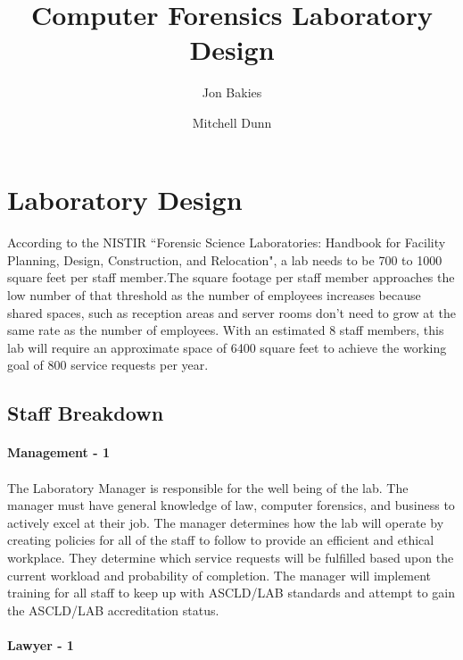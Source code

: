 \documentclass{article}
\begin{document}
\title{Computer Forensics Laboratory Design}
\author{Jon Bakies \and Mitchell Dunn} 

\maketitle
\newpage

\tableofcontents
\newpage


\section{Laboratory Design}
\paragraph{} According to the NISTIR ``Forensic Science Laboratories: Handbook for Facility Planning, Design, Construction, and Relocation", a lab needs to be 700 to 1000 square feet per staff member.The square footage per staff member approaches the low number of that threshold as the number of employees increases because shared spaces, such as reception areas and server rooms don't need to grow at the same rate as the number of employees.  With an estimated 8 staff members, this lab will require an approximate space of 6400 square feet to achieve the working goal of 800 service requests per year.
\subsection{Staff Breakdown}
\paragraph {Management - 1} 
\paragraph{} The Laboratory Manager is responsible for the well being of the lab.  The manager must have general knowledge of law, computer forensics, and business to actively excel at their job.  The manager determines how the lab will operate by creating policies for all of the staff to follow to provide an efficient and ethical workplace.  They determine which service requests will be fulfilled based upon the current workload and probability of completion. The manager will implement training for all staff to keep up with ASCLD/LAB standards and attempt to gain the ASCLD/LAB accreditation status.  
 
\paragraph{Lawyer - 1} 
\end{document}
